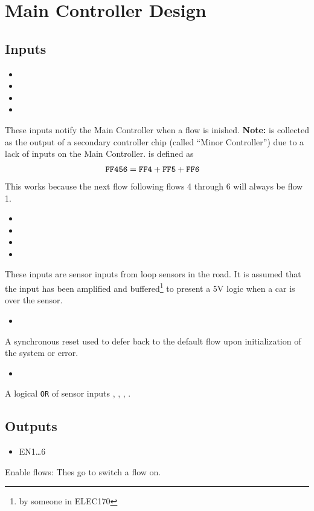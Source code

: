 \section{Main Controller Design}
\subsection{Inputs}
\begin{itemize}
  \item {}
  \item {}
  \item {}
  \item {}
\end{itemize}
These inputs notify the Main Controller when a flow is inished. \textbf{Note:}
 is collected as the output of a secondary controller chip (called
``Minor Controller'') due to a lack of inputs on the Main Controller. 
is defined as
\begin{align}\texttt{FF456} &= \texttt{FF4} + \texttt{FF5} + \texttt{FF6}\end{align}
This works because the next flow following flows 4 through 6 will always be flow
1.

\begin{itemize}
  \item \AR
  \item \B
  \item \CR
  \item \D
\end{itemize}
These inputs are sensor inputs from loop sensors in the road. It is assumed that
the input has been amplified and buffered\footnote{by someone in ELEC170} to
present a 5V logic \HIGH when a car is over the sensor.
\begin{itemize}
  \item \nReset
\end{itemize}
A synchronous reset used to defer back to the default flow upon initialization
of the system or error.
\begin{itemize}
  \item \nS
\end{itemize}
A logical \texttt{OR} of sensor inputs \AR, \B, \CR, \D.

\subsection{Outputs}
\begin{itemize}
  \item EN{1\ldots 6}
\end{itemize}
Enable flows: Thes go \HIGH to switch a flow on.

